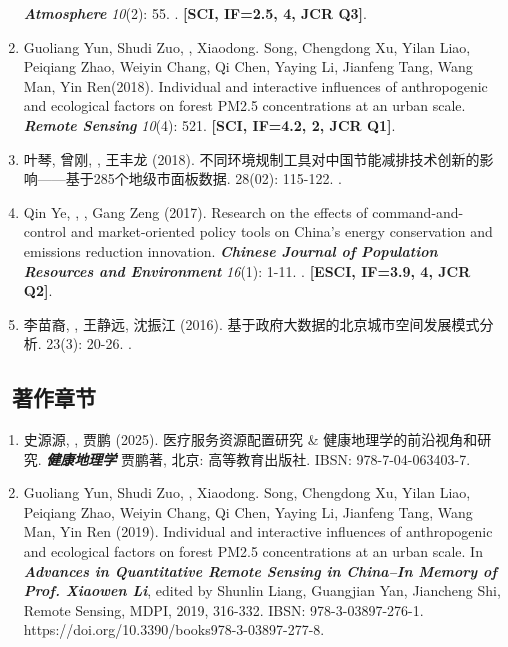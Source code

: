 \begin{enumerate}
    \textbf{\textit{Atmosphere}} \textit{10}(2): 55.
    . 
    \textbf{[SCI, IF=2.5, 4, JCR Q3]}.
\item
    Guoliang Yun, Shudi Zuo, \Shaoqing, Xiaodong. Song, Chengdong Xu, Yilan Liao, Peiqiang Zhao, Weiyin Chang, Qi Chen, Yaying Li, Jianfeng Tang, Wang Man, Yin Ren\CS (2018).
    Individual and interactive influences of anthropogenic and ecological factors on forest PM2.5 concentrations at an urban scale.
    \textbf{\textit{Remote Sensing}} \textit{10}(4): 521.
    \textbf{[SCI, IF=4.2, 2, JCR Q1]}.
\item
    叶琴, 曾刚, {}, 王丰龙 (2018).
	不同环境规制工具对中国节能减排技术创新的影响——基于285个地级市面板数据.
    \textbf{} 28(02): 115-122.
    .  
    \textbf{} 
\item
    Qin Ye\CS, \Shaoqing, , Gang Zeng (2017).
    Research on the effects of command-and-control and market-oriented policy tools on China’s energy conservation and emissions reduction innovation.
    \textbf{\textit{Chinese Journal of Population Resources and Environment}} \textit{16}(1): 1-11.
    . 
    \textbf{[ESCI, IF=3.9, 4, JCR Q2]}.
\item
   李苗裔, {}, 王静远, 沈振江 (2016).
	基于政府大数据的北京城市空间发展模式分析.
    \textbf{} 23(3): 20-26.
    .  
    \textbf{\heiti{[JST]}}
\end{enumerate}

\subsection*{\texorpdfstring{\faBook\ 著作章节}{著作章节}}
\begin{enumerate}
\item
    史源源, {}, 贾鹏 (2025).
    医疗服务资源配置研究 \& 健康地理学的前沿视角和研究. 
    \textbf{\textit{健康地理学}} \space 贾鹏\space 著, 北京: 高等教育出版社. 
    IBSN: 978-7-04-063403-7. 
\item
    Guoliang Yun, Shudi Zuo, \Shaoqing, Xiaodong. Song, Chengdong Xu, Yilan Liao, Peiqiang Zhao, Weiyin Chang, Qi Chen, Yaying Li, Jianfeng Tang, Wang Man, Yin Ren (2019).
	Individual and interactive influences of anthropogenic and ecological factors on forest PM2.5 concentrations at an urban scale. 
    In \textbf{\textit{Advances in Quantitative Remote Sensing in China–In Memory of Prof. Xiaowen Li}}, 
    edited by Shunlin Liang, Guangjian Yan, Jiancheng Shi, Remote Sensing, MDPI, 2019, 316-332. IBSN: 978-3-03897-276-1.
    https://doi.org/10.3390/books978-3-03897-277-8. 
\end{enumerate}

